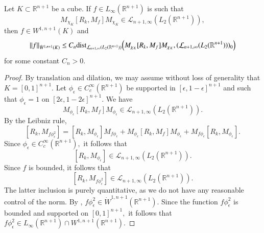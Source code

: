 \documentclass{amsart}
\begin{document}
\begin{lemma}\label{second distance lemma} Let $K\subset\mathbb{R}^{n+1}$ be a cube. If $f\in L_{\infty}(\mathbb{R}^{n+1})$ is such that
$$M_{\chi_K}[R_k,M_f]M_{\chi_K}\in\mathcal{L}_{n+1,\infty}(L_2(\mathbb{R}^{n+1})),$$
then $f\in W^{1,n+1}(K)$ and
$$\|f\|_{\dot{W}^{1,n+1}(K)}\leq C_n{\rm dist}_{\mathcal{L}_{n+1,\infty}(L_2(\mathbb{R}^{n+1}))}\Big(M_{\chi_K}[R_k,M_f]M_{\chi_K},(\mathcal{L}_{n+1,\infty}(L_2(\mathbb{R}^{n+1})))_0\Big)$$
for some constant $C_n>0$.
\end{lemma}
\begin{proof} By translation and dilation, we may assume without loss of generality that $K=[0,1]^{n+1}.$ Let $\phi_{\epsilon}\in C^{\infty}_c(\mathbb{R}^{n+1})$ be supported in $[\epsilon,1-\epsilon]^{n+1}$ and such that $\phi_{\epsilon}=1$ on $[2\epsilon,1-2\epsilon]^{n+1}.$ We have
$$M_{\phi_{\epsilon}}[R_k,M_f]M_{\phi_{\epsilon}}\in\mathcal{L}_{n+1,\infty}(L_2(\mathbb{R}^{n+1})).$$
By the Leibniz rule,
$$[R_k,M_{f\phi_{\epsilon}^2}]=[R_k,M_{\phi_{\epsilon}}] M_{f\phi_{\epsilon}}+M_{\phi_{\epsilon}}[R_k,M_f]M_{\phi_{\epsilon}}+M_{f\phi_{\epsilon}} [R_k,M_{\phi_{\epsilon}}].$$
Since $\phi_{\epsilon}\in C^{\infty}_c(\mathbb{R}^{n+1}),$ it follows that
$$[R_k,M_{\phi_{\epsilon}}]\in\mathcal{L}_{n+1,\infty}(L_2(\mathbb{R}^{n+1})).$$
Since $f$ is bounded, it follows that
$$[R_k,M_{f\phi_{\epsilon}^2}]\in\mathcal{L}_{n+1,\infty}(L_2(\mathbb{R}^{n+1})).$$
The latter inclusion is purely quantitative, as we do not have any reasonable control of the norm. By \cite[Theorem 1]{LMSZ}, $f\phi_{\epsilon}^2\in \dot{W}^{1,n+1}(\mathbb{R}^{n+1}).$ Since the function $f\phi_{\epsilon}^2$ is bounded and supported on $[0,1]^{n+1},$ it follows that $f\phi_{\epsilon}^2\in L_{\infty}(\mathbb{R}^{n+1})\cap W^{1,n+1}(\mathbb{R}^{n+1}).$


\end{proof}
\end{document}
